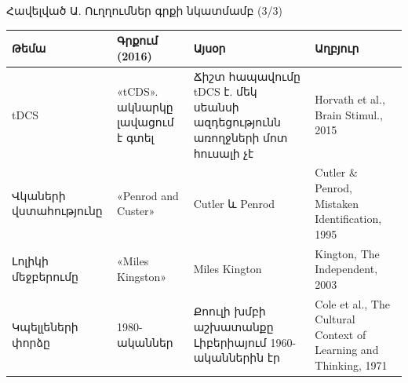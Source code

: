 \begin{frame}{Հավելված Ա. Ուղղումներ գրքի նկատմամբ (3/3)}
  \footnotesize
  \setlength{\tabcolsep}{4pt}
  \renewcommand{\arraystretch}{1.22}
  \begin{tabular}{@{}L{2.6cm}L{3.2cm}L{4.5cm}L{3.2cm}@{}}
    \toprule
    \textbf{Թեմա} & \textbf{Գրքում (2016)} & \textbf{Այսօր} & \textbf{Աղբյուր}\\
    \midrule
    tDCS & «tCDS». ակնարկը լավացում է գտել & Ճիշտ հապավումը tDCS է. մեկ սեանսի ազդեցությունն առողջների մոտ հուսալի չէ & Horvath et al., Brain Stimul., 2015\\
    Վկաների վստահությունը & «Penrod and Custer» & Cutler և Penrod & Cutler \& Penrod, Mistaken Identification, 1995\\
    Լոլիկի մեջբերումը & «Miles Kingston» & Miles Kington & Kington, The Independent, 2003\\
    Կպելլեների փորձը & 1980-ականներ & Քոուլի խմբի աշխատանքը Լիբերիայում 1960-ականներին էր & Cole et al., The Cultural Context of Learning and Thinking, 1971\\
    \bottomrule
  \end{tabular}
\end{frame}

